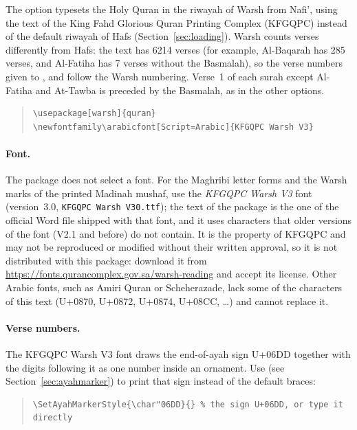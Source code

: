 \documentclass{ltxdoc}
\def\xmgpar#1{\xoption{#1}\marginpar{\xoption{#1}}}
\begin{document}
The \xmgpar{warsh} option typesets the Holy Quran in the riwayah of Warsh
from Nafi', using the text of the King Fahd Glorious Quran Printing Complex
(KFGQPC) instead of the default riwayah of Hafs (Section~\ref{sec:loading}). Warsh counts verses differently from Hafs: the text has 6214 verses
(for example, Al-Baqarah has 285 verses, and Al-Fatiha has 7 verses without
the Basmalah), so the verse numbers given to , 
and  follow the Warsh numbering. Verse~1 of each surah except
Al-Fatiha and At-Tawba is preceded by the Basmalah, as in the other options.

\begin{quote}
\begin{lstlisting}[style=BashInputStyle]
\usepackage[warsh]{quran}
\newfontfamily\arabicfont[Script=Arabic]{KFGQPC Warsh V3}
\end{lstlisting}
\end{quote}

\paragraph{Font.} The package does not select a font. For the Maghribi letter
forms and the Warsh marks of the printed Madinah mushaf, use the
\emph{KFGQPC Warsh V3} font (version~3.0, \texttt{KFGQPC Warsh V30.ttf}); the text of
the package is the one of the official Word file shipped with that font, and it uses
characters that older versions of the font (V2.1 and before) do not contain.
It is the property of KFGQPC and may not be reproduced or modified without
their written approval, so it is not distributed with this package: download
it from \url{https://fonts.qurancomplex.gov.sa/warsh-reading} and accept its
license. Other Arabic fonts, such as Amiri Quran or Scheherazade, lack some of the
characters of this text (U+0870, U+0872, U+0874, U+08CC, \dots) and cannot replace it.

\paragraph{Verse numbers.} The KFGQPC Warsh V3 font draws the end-of-ayah sign U+06DD
together with the digits following it as one number inside an ornament.
Use  (see Section~\ref{sec:ayahmarker}) to print that sign
instead of the default braces:

\begin{quote}
\begin{lstlisting}[style=BashInputStyle]
\SetAyahMarkerStyle{\char"06DD}{} % the sign U+06DD, or type it directly
\end{lstlisting}
\end{quote}
\end{document}
